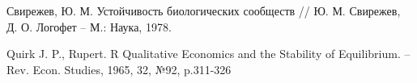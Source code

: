\begin{thebibliography}{9}
        Свирежев, Ю. М. Устойчивость биологических сообществ // Ю. М. Свирежев, Д. О. Логофет -- М.: Наука, 1978.
    
        Quirk J. P., Rupert. R Qualitative Economics and the Stability of Equilibrium. -- Rev. Econ. Studies, 1965, 32, №92, p.311-326


\end{thebibliography}
